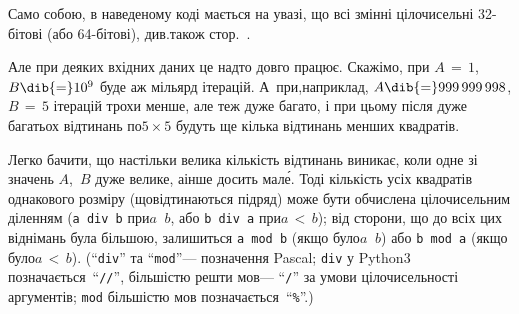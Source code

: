 {Само собою, в наведеному коді мається на увазі, що всі змінні цілочисельні \mbox{32-бі}\-тові (або \mbox{64-бі}\-тові), див.\nolinebreak[2] також стор.~\pageref{text:overflow-example}.

Але при деяких вхідних даних це надто довго працює. Скажімо, при ${A\,{=}\,1}$, $B\dib{{=}}10^9$ буде аж мільярд ітерацій. А~при,\nolinebreak[2] наприклад, $A\dib{{=}}999\,999\,998$, ${B\,{=}\,5}$ ітерацій трохи менше, але теж дуже багато, і при цьому після дуже багатьох відтинань по\nolinebreak[3] $5{\times}5$ будуть ще кілька відтинань менших квадратів.

Легко бачити, що настільки велика кількість відтинань виникає, коли одне зі значень $A$,~$B$ дуже велике, а\nolinebreak[3] інше досить мал\'{е}. Тоді кількість усіх квадратів однакового розміру (що\nolinebreak[3] відтинаються підряд) може бути обчислена %
цілочисельним діленням (\texttt{a~div~b} при\nolinebreak[2] ${a\,{\>}\,b}$, або \texttt{b~div~a} при\nolinebreak[2] ${a\,{<}\,b}$); від сторони, що до всіх цих віднімань була більшою, залишиться \texttt{a~mod~b} (якщо було\nolinebreak[2] ${a\,{\>}\,b}$) або \texttt{b~mod~a} (якщо було\nolinebreak[2] ${a\,{<}\,b}$). (``\texttt{div}'' та ``\texttt{mod}''\nolinebreak[3] --- позначення Pascal; \texttt{div} у Python3 позначається~``\verb"//"'', більшістю решти мов\nolinebreak[3] --- ``\verb"/"'' за умови цілочисельності аргументів; \texttt{mod} більшістю мов позначається~``\verb"%"''.)


}
